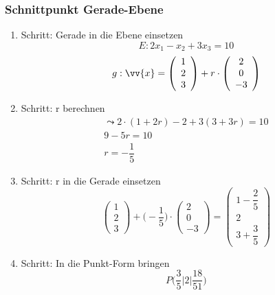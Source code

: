 \documentclass[a4paper, 15pt]{article}
\begin{document}
\subsubsection{Schnittpunkt Gerade-Ebene}
\begin{minipage}{.49\textwidth}
\begin{enumerate}
\item Schritt: Gerade in die Ebene einsetzen\newline
\begin{equation*}
E: 2x_1-x_2+3x_3=10
\end{equation*}
\begin{equation*}
g:\vv{x}= \left(\begin{array}{c} 1 \\ 2 \\ 3 \end{array}\right) + r \cdot \left(\begin{array}{c} 2 \\ 0 \\ -3 \end{array}\right)
\end{equation*}
\item Schritt: r berechnen
\begin{align*}
\leadsto 2\cdot(1+2r)-2+3(3+3r)=10 \\
9-5r = 10 \\
r = -\dfrac{1}{5}
\end{align*}
\end{enumerate}
\end{minipage}
\begin{minipage}{.49\textwidth}
\begin{enumerate}
\setcounter{enumi}{2}
\item Schritt: r in die Gerade einsetzen
\begin{equation*}
\left(\begin{array}{c} 1 \\ 2 \\ 3 \end{array}\right)+\biggl(-\dfrac{1}{5}\biggl)\cdot \left(\begin{array}{c} 2 \\ 0 \\ -3 \end{array}\right) = \left(\begin{array}{c} 1-\dfrac{2}{5} \\ 2 \\ 3+\dfrac{3}{5} \end{array}\right)
\end{equation*}
\item Schritt: In die Punkt-Form bringen
\begin{equation*}
P\biggl(\dfrac{3}{5}\biggl|2\biggl|\dfrac{18}{51}\biggl)
\end{equation*}
\end{enumerate}
\end{minipage}
\newpage
\end{document}
